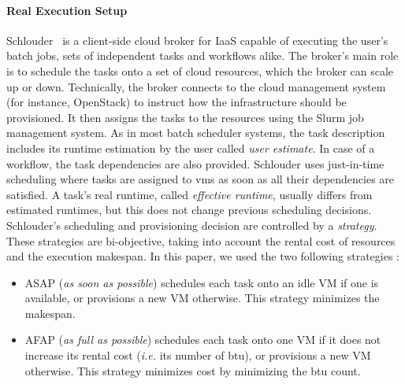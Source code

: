\documentclass[]{llncs}
\begin{document}
\paragraph{Real Execution Setup}
Schlouder~\cite{Michon17} is a client-side cloud broker for IaaS capable of
executing the  user's batch jobs, sets of independent tasks and workflows alike.
The broker's main role is  to schedule the tasks onto a set of cloud resources, 
which the broker can scale up  or down.
Technically, the broker  connects to the cloud management  system (for instance,
OpenStack) to  instruct how  the infrastructure should  be provisioned. It then
assigns the tasks to the resources using the Slurm job management system.
%
As in  most batch scheduler systems,  the task description includes  its runtime
estimation by the user called \emph{user  estimate}.  In case of a workflow, the
task  dependencies are  also provided.   Schlouder uses  just-in-time scheduling
where  tasks are  assigned to  \acp{vm} as  soon as  all their  dependencies are
satisfied.  A  task's real  runtime,  called  \emph{effective runtime},  usually
differs from  estimated runtimes, but  this does not change  previous scheduling
decisions. Schlouder's scheduling and provisioning  decision are controlled by a
\emph{strategy}.  These strategies  are  bi-objective, taking  into account  the
rental cost of resources and the execution  makespan. In this paper, we used the
two following strategies :
\begin{itemize}
\item ASAP (\textit{as soon as possible}) schedules each task onto
  an idle VM if one is available, or provisions a new VM otherwise.
  This strategy minimizes the makespan.

\item AFAP (\textit{as full as  possible}) schedules each task onto
  one VM if it does not increase its rental cost (\textit{i.e.} its number
  of \ac{btu}), or provisions a new VM otherwise. This strategy minimizes cost
  by minimizing the \ac{btu} count.
\end{itemize}
\end{document}
